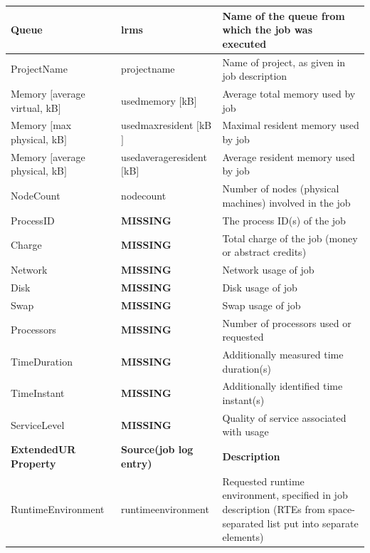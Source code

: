 \documentclass{article}                            %
\begin{document}
\begin{tabular}{|p{}|p{}|p{}|}
\hline
Queue&
lrms&
Name of the queue from which the job was executed\\
\hline
ProjectName&
projectname&
Name of project, as given in job description\\
\hline
Memory\newline
$[$average virtual, kB$]$&
usedmemory $[$kB$]$&
Average total memory used by job\\
\hline
Memory\newline
$[$max physical, kB$]$&
usedmaxresident $[$kB$]$&
Maximal resident memory used by job\\
\hline
Memory\newline
$[$average physical, kB$]$&
usedaverageresident $[$kB$]$&
Average resident memory used by job\\
\hline
NodeCount&
nodecount&
Number of nodes (physical machines) involved in the job\\
\hline
ProcessID&
\textbf{MISSING}&
The process ID(s) of the job\\
\hline
Charge&
\textbf{MISSING}&
Total charge of the job (money or abstract credits)\\
\hline
Network&
\textbf{MISSING}&
Network usage of job\\
\hline
Disk&
\textbf{MISSING}&
Disk usage of job\\
\hline
Swap&
\textbf{MISSING}&
Swap usage of job\\
\hline
Processors&
\textbf{MISSING}&
Number of processors used or requested\\
\hline
TimeDuration&
\textbf{MISSING}&
Additionally measured time duration(s)\\
\hline
TimeInstant&
\textbf{MISSING}&
Additionally identified time instant(s)\\
\hline
ServiceLevel&
\textbf{MISSING}&
Quality of service associated with usage\\
\hline
\hline
\textbf{Extended\newline UR Property}&
\textbf{Source\newline(job log entry)}&
\textbf{Description}\\
\hline\hline
RuntimeEnvironment&
runtimeenvironment&
Requested runtime environment, specified in job description\newline
(RTEs from space-separated list put into separate elements)\\

\hline
\end{tabular}
\end{document}
